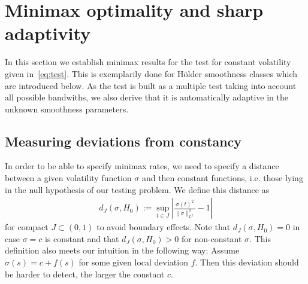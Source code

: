 \documentclass[10.5pt,letter]{article}
\numberwithin{equation}{section}
\theoremstyle{definition}
\newcommand{\1}{\mathbbm{1}}
\begin{document}
\section{Minimax optimality and sharp adaptivity}\label{Section:power_properties}

In this section we establish minimax results for the test for constant volatility given in~\eqref{eq:test}. This is exemplarily done for Hölder smoothness classes which are introduced below. As the test is built as a multiple test taking into account all possible bandwiths, we also derive that it is automatically adaptive in the unknown smoothness parameters.





\subsection{Measuring deviations from constancy}
In order to be able to specify minimax rates, we need to specify a distance between a given volatility function $\sigma$ and then constant functions, i.e. those lying in the null hypothesis of our testing problem. We define this distance as
\begin{align*}
    d_J(\sigma,H_0) := \sup_{t\in J}\left| \frac{\sigma(t)^2}{\|\sigma\|_{L^2}^2} -1 \right|
\end{align*}
for compact $J\subset (0,1)$ to avoid boundary effects. Note that $d_J(\sigma,H_0)=0$ in case $\sigma=c$ is constant and that $d_J(\sigma,H_0)>0$ for non-constant $\sigma$. This definition also meets our intuition in the following way: Assume $\sigma(s)=c+f(s)$ for some given local deviation $f$. Then this deviation should be harder to detect, the larger the constant $c$. 
\end{document}
